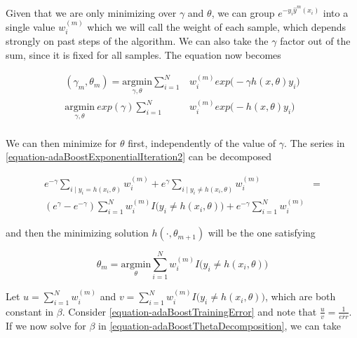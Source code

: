 \documentclass{article}%
\theoremstyle{definition}
\begin{document}
Given that we are only minimizing over $\gamma$ and $\theta$, we can group $e^{-y_i  \hat{y}^{m}(x_i)}$ into a single value $w_i^{(m)}$ which we will call the weight of each sample, which depends strongly on past steps of the algorithm. We can also take the $\gamma$ factor out of the sum, since it is fixed for all samples. The equation now becomes

\begin{equation} \label{equation-adaBoostExponentialIteration2}
\begin{split}
(\gamma_{m}, \theta_{m}) = \underset{\gamma, \theta}{\mathrm{argmin}}  \sum_{i=1}^{N} &  w_i^{(m)} exp \big(- \gamma h(x,\theta)y_i \big) \\
 \underset{\gamma, \theta}{\mathrm{argmin}} \  exp(\gamma) \sum_{i=1}^{N} & w_i^{(m)} exp \big( - h(x,\theta)y_i \big) \\
\end{split}
\end{equation}

We can then minimize for $\theta$ first, independently of the value of $\gamma$. The series in \ref{equation-adaBoostExponentialIteration2} can be decomposed 

\begin{equation} \label{equation-adaBoostThetaDecomposition}
\begin{split}
e^{-\gamma} \sum_{i \mid y_i = h(x_i,\theta)} w_i^{(m)}  + e^{\gamma} \sum_{i \mid y_i \neq h(x_i,\theta)} w_i^{(m)} & = \\
( e^{\gamma} - e^{-\gamma}) \sum_{i = 1}^{N} w_i^{(m)} I \big( y_i \neq h(x_i,\theta)   \big)  + e^{-\gamma} \sum_{i = 1}^{N}   w_i^{(m)} &
\end{split}
\end{equation}


and then the minimizing solution $h(\cdot, \theta_{m+1})$ will be the one satisfying

 \begin{equation} \label{equation-adaBoostThetaMinimization}
  \theta_{m} = \underset{ \theta}{\mathrm{argmin}}  \sum_{i=1}^{N}  w_i^{(m)} I \big( y_i \neq h(x_i,\theta)   \big) 
 \end{equation}

Let $u = \sum_{i=1}^{N}  w_i^{(m)}$ and $v = \sum_{i=1}^{N}  w_i^{(m)} I \big( y_i \neq h(x_i,\theta)   \big) $, which are both constant in $\beta$. Consider \ref{equation-adaBoostTrainingError} and note that $\frac{u}{v} = \frac{1}{\overline{err}}$. If we now solve for $\beta$ in \ref{equation-adaBoostThetaDecomposition}, we can take
\end{document}
